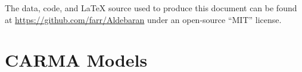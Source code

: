 \documentclass[modern]{aastex61}
\begin{document}
The data, code, and \LaTeX{} source used to produce this document can be found
at \url{https://github.com/farr/Aldebaran} under an open-source ``MIT'' license.




\appendix

\section{CARMA Models}
\label{carmatheory}
\end{document}
